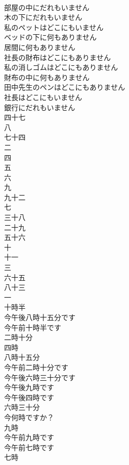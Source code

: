\documentclass[8pt]{extreport}
\begin{document}
\begin{CJK}{UTF8}{min}
\\	部屋の中にだれもいません	
\\	木の下にだれもいません	
\\	私のペットはどこにもいません	
\\	ベッドの下に何もありません	
\\	居間に何もありません	
\\	社長の財布はどこにもありません	
\\	私の消しゴムはどこにもありません	
\\	財布の中に何もありません	
\\	田中先生のペンはどこにもありません	
\\	社長はどこにもいません	
\\	銀行にだれもいません	
\\	四十七	
\\	八	
\\	七十四	
\\	二	
\\	四	
\\	五	
\\	六	
\\	九	
\\	九十二	
\\	七	
\\	三十八	
\\	二十九	
\\	五十六	
\\	十	
\\	十一	
\\	三	
\\	六十五	
\\	八十三	
\\	一	
\\	十時半	
\\	今午後八時十五分です	
\\	今午前十時半です	
\\	二時十分	
\\	四時	
\\	八時十五分	
\\	今午前二時十分です	
\\	今午後六時三十分です	
\\	今午後九時です	
\\	今午後四時です	
\\	六時三十分	
\\	今何時ですか？	
\\	九時	
\\	今午前九時です	
\\	今午前七時です	
\\	七時	

\end{CJK}
\end{document}
